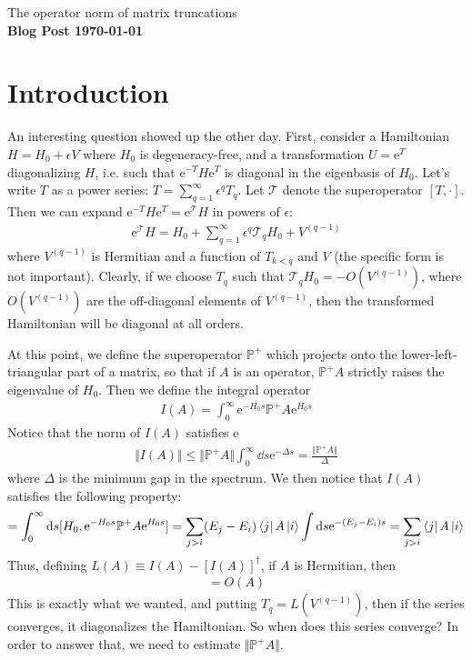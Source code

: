 \documentclass[11pt]{article}
\newcommand{\e}{\mathrm e}
\begin{document}
\noindent\huge{The operator norm of matrix truncations} \\
\normalsize\textbf{Blog Post \today}

\section{Introduction}
An interesting question showed up the other day. First, consider a Hamiltonian $H = H_0 + \epsilon V$ where $H_0$ is degeneracy-free, and a transformation $U = \e^{T}$ diagonalizing $H$, i.e. such that $\e^{-T}H\e^{T}$ is diagonal in the eigenbasis of $H_0$. Let's write $T$ as a power series: $T = \sum_{q=1}^{\infty}\epsilon^qT_q$. Let $\mathcal T$ denote the superoperator $[T, \cdot]$. Then we can expand $\e^{-T}H\e^{T} = \e^{\mathcal T}H$ in powers of $\epsilon$:
\begin{align}
    \e^{\mathcal T}H = H_0 + \sum_{q=1}^{\infty}\epsilon^q\mathcal T_qH_0 + V^{(q-1)}
\end{align}
where $V^{(q-1)}$ is Hermitian and a function of $T_{k < q}$ and $V$ (the specific form is not important). Clearly, if we choose $T_q$ such that $\mathcal T_qH_0 = -O(V^{(q-1)})$, where $O(V^{(q-1)})$ are the off-diagonal elements of $V^{(q-1)}$, then the transformed Hamiltonian will be diagonal at all orders. 

At this point, we define the superoperator $\mathbb P^+$ which projects onto the lower-left-triangular part of a matrix, so that if $A$ is an operator, $\mathbb P^+A$ strictly raises the eigenvalue of $H_0$. Then we define the integral operator
\begin{align}
    I(A) = \int_0^\infty \e^{-H_0s}\mathbb P^+A \e^{H_0s}
\end{align}
Notice that the norm of $I(A)$ satisfies
e\begin{align}
    \Vert I(A) \Vert \leq \Vert \mathbb P^+ A\Vert\int_{0}^{\infty}\dd s\e^{-\Delta s} = \frac{\Vert \mathbb P^+ A\Vert}{\Delta}
\end{align}
where $\Delta$ is the minimum gap in the spectrum. We then
notice that $I(A)$ satisfies the following property:
\begin{align}
    [H_0, I(A)] = \int_0^\infty \dd s [H_0, \e^{-H_0s}\mathbb P^+A\e^{H_0s}] = \sum_{j>i}(E_j-E_i)\bra{j}A\ket{i} \int \dd s \e^{-(E_j-E_i)s} = \sum_{j>i}\bra{j}A\ket{i}
\end{align}
Thus, defining $L(A) \equiv I(A) - [I(A)]^\dagger$, if $A$ is Hermitian, then
\begin{align}
    [H_0, L(A)] = O(A)
\end{align}
This is exactly what we wanted, and putting $T_q = L(V^{(q-1)})$, then if the series converges, it diagonalizes the Hamiltonian. So when does this series converge? In order to answer that, we need to estimate $\Vert\mathbb P^+ A\Vert$. 
\end{document}

